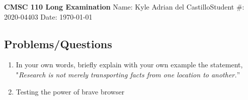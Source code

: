 \documentclass{article}
\date{\displaydate{date}}
\begin{document}
\begin{center}
    \textbf{CMSC 110 Long Examination} \break\break
    Name: Kyle Adrian del Castillo\quad Student \#: 2020-04403 \quad Date: \today
\end{center}

\subsection*{Problems/Questions}
\begin{enumerate}
    \item In your own words, briefly explain with your own example the statement, "\emph{Research is not merely transporting facts from one location to another.}”
    \item Testing the power of brave browser

\end{enumerate}


\end{document}
